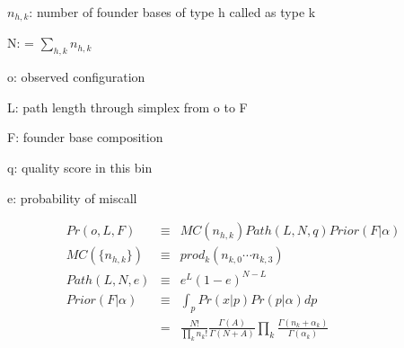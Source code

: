 \documentclass{article}
\begin{document}
$n_{h,k}$: number of founder bases of type h called as type k

N: = $\sum_{h,k}{n_{h,k}}$

o: observed configuration

L: path length through simplex from o to F

F: founder base composition

q: quality score in this bin

e: probability of miscall

\begin{eqnarray}
Pr(o, L, F) & \equiv & MC(n_{h,k}) Path(L, N, q) Prior(F|\alpha) \\[6ex]
MC(\{n_{h,k}\}) & \equiv & prod_k (n_{k,0} \cdots n_{k,3}) \\[6ex]
Path(L, N, e) & \equiv & e^L (1-e)^{N-L} \\[6ex]
Prior(F|\alpha) & \equiv & \int_p{Pr(x|p)Pr(p|\alpha)dp} \\
& = & \frac{N!}{\prod_k n_k!} 
\frac{\Gamma(A)}{\Gamma(N+A)} 
\prod_k \frac{\Gamma(n_k+\alpha_k)}{\Gamma(\alpha_k)} \\[6ex]
\end{eqnarray}
\end{document}
